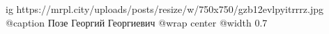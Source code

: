  
 
 
 
 

\ifcmt
  ig https://mrpl.city/uploads/posts/resize/w/750x750/gzb12evlpyitrrrz.jpg
	@caption Позе Георгий Георгиевич
  @wrap center
  @width 0.7
\fi
